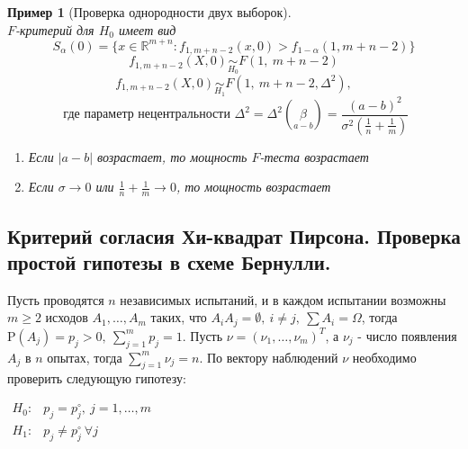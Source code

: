 \documentclass[12pt]{article}
\newtheorem*{example}{Пример}
\theoremstyle{basic_theorem}
\theoremstyle{name_theorem}
\def\R{ \mathbb{R} }
\def\P{ \mathrm{P} }
\begin{document}
\begin{example}[Проверка однородности двух выборок]
\[    \]
    $F$-критерий для $H_0$ имеет вид
    \[S_{\alpha}(0)=\{x\in\R^{m+n}:f_{1,m+n-2}(x,0)>f_{1-\alpha}(1,m+n-2)\}\]
    \[f_{1,m+n-2}(X,0)\underset{H_0}{\sim}F(1,\ m+n-2)\]
    \[f_{1,m+n-2}(X,0)\underset{H_1}{\sim}F(1,\ m+n-2,\Delta^2),\]
    \[\text{ где параметр нецентральности } \Delta^2=\Delta^2(\underset{a-b}{\beta})=\frac{(a-b)^2}{\sigma^2\left(\frac{1}{n}+\frac{1}{m}\right)}\]
    \begin{enumerate}
        \item Если $\vert a-b\vert$  возрастает, то мощность $F$-теста возрастает
        \item Если $\sigma\rightarrow0$ или $\frac{1}{n}+\frac{1}{m}\rightarrow0$, то мощность возрастает
    \end{enumerate}
    \end{example}
\subsection{Критерий согласия Хи-квадрат Пирсона. Проверка простой гипотезы в схеме Бернулли.}
    Пусть проводятся $n$ независимых испытаний, и в каждом испытании возможны
    $m\geq2$ исходов $A_1,\ldots,A_m$ таких, что $A_iA_j=\emptyset,\ i\neq j,\ \sum A_i=\Omega$, тогда
    $\P(A_j)=p_j>0,\ \sum_{j=1}^mp_j=1$. Пусть $\nu=(\nu_1,\ldots,\nu_m)^T$, а $\nu_j$ -
    число появления $A_j$ в $n$ опытах, тогда $\sum_{j=1}^m\nu_j=n$.
    По вектору наблюдений $\nu$ необходимо проверить следующую гипотезу:

    $\begin{array}{cl}
        H_0:& p_j=p_j^\circ,\ j=1,\ldots,m\\
        H_1:& p_j\neq p_j^\circ\ \forall j
    \end{array}$
\end{document}
